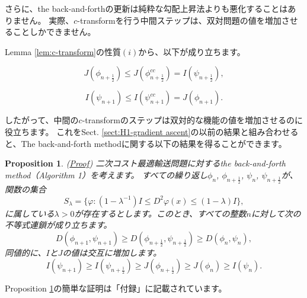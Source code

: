 \documentclass{jsarticle}
\newtheorem{prop}[thm]{Proposition}
\theoremstyle{definition}
\begin{document}
さらに、the back-and-forthの更新は純粋な勾配上昇法よりも悪化することはありません。
実際、$c$-transformを行う中間ステップは、双対問題の値を増加させることしかできません。
{\color{teal}
Lemma \ref{lem:c-transform}の性質$(i)$から、以下が成り立ちます。

$$
J(\phi_{n + \frac{1}{2}}) \leq J(\phi_{n + \frac{1}{2}}^{cc}) = I(\psi_{n + \frac{1}{2}}),
$$

$$
I(\psi_{n+1}) \leq I(\psi_{n + 1}^{cc}) = J(\phi_{n+1}).
$$
}

したがって、中間の$c$-transformのステップは双対的な機能の値を増加させるのに役立ちます。
これをSect. \ref{sect:H1-gradient ascent}の以前の結果と組み合わせると、The back-and-forth methodに関する以下の結果を得ることができます。\\

\color{teal}
\begin{prop}
  \label{prop:不等式連鎖}
  (\hyperlink{proof:prop:不等式連鎖}{Proof})
  二次コスト最適輸送問題に対するthe back-and-forth method（Algorithm 1）を考えます。
  すべての繰り返し$\phi_n$, $\phi_{n + \frac{1}{2}}$, $\psi_n$, $\psi_{n + \frac{1}{2}}$が、
  関数の集合
  $$
  S_{\lambda}=\{\varphi:(1-\lambda^{-1})I\leq D^2\varphi(x)\leq (1-\lambda)I\},
  $$
  に属している$\lambda > 0$が存在するとします。このとき、すべての整数$n$に対して次の不等式連鎖が成り立ちます。
  $$
  D(\phi_{n+1},\psi_{n+1})\geq D(\phi_{n + \frac{1}{2}},\psi_{n + \frac{1}{2}})\geq D(\phi_n,\psi_n),
  $$
  同値的に、$I$と$J$の値は交互に増加します。
  $$
  I(\psi_{n+1})\geq I(\psi_{n + \frac{1}{2}})\geq J(\phi_{n + \frac{1}{2}})\geq J(\phi_n)\geq I(\psi_n).
  $$
\end{prop}

\color{black}
Proposition \ref{prop:不等式連鎖}の簡単な証明は「付録」に記載されています。

\begin{comment}
  Proposition 2の簡単な証明を以下に示します。

  1. 全ての反復$\varphi_n$、$\varphi_{n+1/2}$、$\psi_n$、$\psi_{n+1/2}$が関数集合$S_{\lambda}=\{\varphi:(1-\lambda^{-1})I\leq D^2\varphi(x)\leq(1-\lambda)I\}$に属すると仮定します。
  2. 反復の定義を使用して、$\varphi_{n+1}$と$\psi_{n+1}$を$\varphi_n$、$\varphi_{n+1/2}$、$\psi_n$、$\psi_{n+1/2}$の式で表します。
  3. 関数集合$S_{\lambda}$に関する仮定を使用して、$\varphi_{n+1}$と$\varphi_{n+1/2}$の差、および$\psi_{n+1}$と$\psi_{n+1/2}$の差を境界します。
  4. 差の境界と二次コスト関数の性質を使用して、不等式$D(\varphi_{n+1},\psi_{n+1})\geq D(\varphi_{n+1/2},\psi_{n+1/2})\geq D(\varphi_n,\psi_n)$を導出します。
  5. 原始問題と双対問題の双方の関係性と二次コスト関数の性質を使用して、不等式$I(\psi_{n+1})\geq I(\psi_{n+1/2})\geq J(\varphi_{n+1/2})\geq J(\varphi_n)\geq I(\psi_n)$を導出します。

  注意：これは一般的な概要であり、実際の証明には追加の手順と技術的な詳細が必要な場合があります。
\end{comment}
\end{document}
